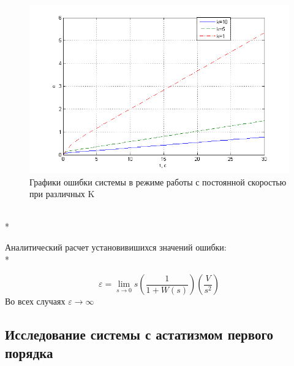 \documentclass[a4paper, 12pt]{article}
\begin{document}
\begin{figure}[h]
	\centering
	\includegraphics[width = 1\textwidth]{hinh3}
	\caption{Графики ошибки системы в режиме работы с постоянной скоростью  при различных K}
\end{figure}\hfill\\*
\newpage
\begin{flushleft}
	Аналитический расчет установивишихся значений ошибки:\\*
\end{flushleft} 
\begin{equation}
\varepsilon=\lim_{s \to 0} s(\frac{1}{1+W(s)})(\frac{V}{s^2})
\end{equation}
Во всех случаях $\varepsilon \to \infty$\\
\newpage
\begin{center}
	\section*{ Исследование системы с астатизмом первого порядка}
\end{center}
\end{document}

